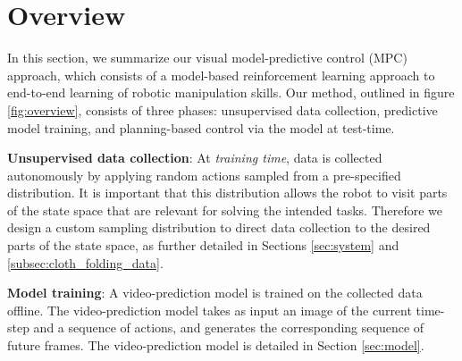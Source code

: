\section{Overview}\label{sec:prelim}
\label{sec:vmpc}

In this section, we summarize our visual model-predictive control (MPC) approach, which consists of a model-based reinforcement learning approach to end-to-end learning of robotic manipulation skills. Our method, outlined in figure \ref{fig:overview}, consists of three phases: unsupervised data collection, predictive model training, and planning-based control via the model at test-time.

\noindent \textbf{Unsupervised data collection}: At \emph{training time}, data is collected autonomously by applying random actions sampled from a pre-specified distribution. It is important that this distribution allows the robot to visit parts of the state space that are relevant for solving the intended tasks. Therefore we design a custom sampling distribution to direct data collection to the desired parts of the state space, as further detailed in Sections \ref{sec:system} and \ref{subsec:cloth_folding_data}.

\noindent \textbf{Model training}: A video-prediction model is trained on the collected data offline. The video-prediction model takes as input an image of the current time-step and a sequence of actions, and generates the corresponding sequence of future frames. The video-prediction model is detailed in Section \ref{sec:model}.

